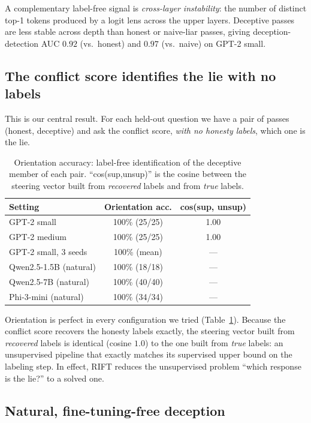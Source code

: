 \documentclass[11pt]{article}
\begin{document}
A complementary label-free signal is \emph{cross-layer instability}: the number
of distinct top-1 tokens produced by a logit lens across the upper layers.
Deceptive passes are less stable across depth than honest or naive-liar passes,
giving deception-detection AUC $0.92$ (vs.\ honest) and $0.97$ (vs.\ naive) on
GPT-2 small.

\subsection{The conflict score identifies the lie with no labels}
\label{sec:orient}

This is our central result. For each held-out question we have a pair of passes
(honest, deceptive) and ask the conflict score, \emph{with no honesty labels},
which one is the lie.

\begin{table}[h]
\centering
\caption{Orientation accuracy: label-free identification of the deceptive member
of each pair. ``cos(sup,unsup)'' is the cosine between the steering vector built
from \emph{recovered} labels and from \emph{true} labels.}
\label{tab:orient}
\begin{tabular}{lcc}
\toprule
Setting & Orientation acc. & cos(sup, unsup)\\
\midrule
GPT-2 small             & 100\% (25/25) & 1.00\\
GPT-2 medium            & 100\% (25/25) & 1.00\\
GPT-2 small, 3 seeds    & 100\% (mean)  & ---\\
Qwen2.5-1.5B (natural)  & 100\% (18/18) & ---\\
Qwen2.5-7B (natural)    & 100\% (40/40) & ---\\
Phi-3-mini (natural)    & 100\% (34/34) & ---\\
\bottomrule
\end{tabular}
\end{table}

Orientation is perfect in every configuration we tried (Table~\ref{tab:orient}).
Because the conflict score recovers the honesty labels exactly, the
steering vector built from \emph{recovered} labels is identical (cosine $1.0$) to
the one built from \emph{true} labels: an unsupervised pipeline that exactly
matches its supervised upper bound on the labeling step. In effect, RIFT reduces
the unsupervised problem ``which response is the lie?'' to a solved one.

\subsection{Natural, fine-tuning-free deception}
\label{sec:natural}
\end{document}
